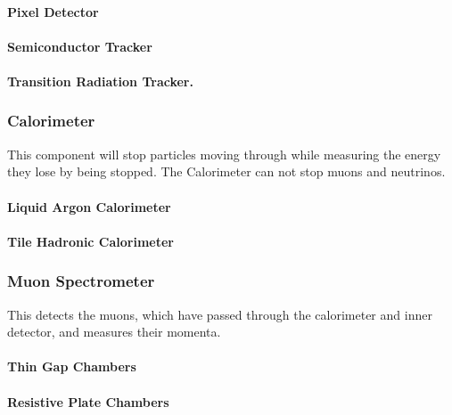 \documentclass[11pt,a4paper]{article}
\begin{document}
\paragraph{Pixel Detector}
\paragraph{Semiconductor Tracker}
\paragraph{Transition Radiation Tracker.}

\subsubsection{Calorimeter}
This component will stop particles moving through while measuring the
energy they lose by being stopped. %
The Calorimeter can not stop muons and neutrinos.

\paragraph{Liquid Argon Calorimeter}
\paragraph{Tile Hadronic Calorimeter}

\subsubsection{Muon Spectrometer}
This detects the muons, which have passed through the calorimeter and inner
detector, and measures their momenta.

\paragraph{Thin Gap Chambers}
\paragraph{Resistive Plate Chambers}
\end{document}
